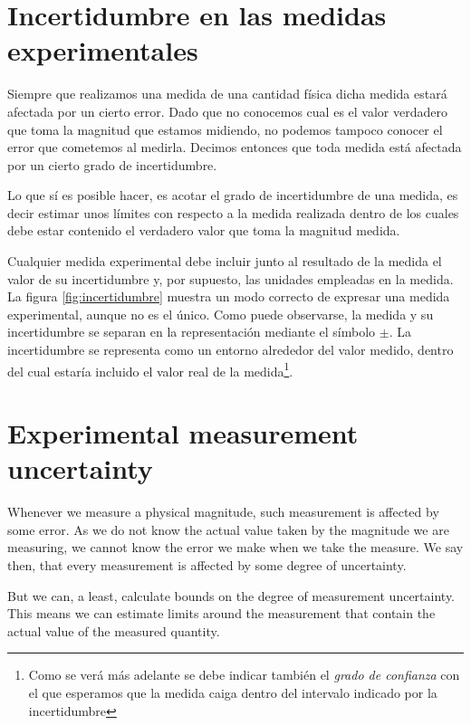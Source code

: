 \begin{paracol}{2}
\section{Incertidumbre en las medidas experimentales}
Siempre que realizamos una medida de una cantidad física dicha medida  estará afectada por un cierto error. Dado que no conocemos cual es el valor verdadero que toma la magnitud que estamos midiendo, no podemos tampoco conocer el error que cometemos al medirla. Decimos entonces que toda medida está afectada por un cierto grado de incertidumbre.

Lo que sí es posible hacer, es acotar el grado de incertidumbre de una medida, es decir estimar unos límites con respecto a la medida realizada dentro de los cuales debe estar contenido el verdadero valor que toma la magnitud medida.

Cualquier medida experimental debe incluir junto al resultado de la medida el valor de su incertidumbre y, por supuesto, las unidades empleadas en la medida. La figura \ref{fig:incertidumbre} muestra un modo correcto de expresar una medida experimental, aunque no es el único. Como puede observarse, la medida y su incertidumbre se separan en la representación mediante el símbolo $\pm$.  La incertidumbre se representa como  un entorno alrededor del valor medido, dentro del cual estaría incluido el valor real de la medida\footnote{Como se verá más adelante se debe indicar también el \emph{grado de confianza} con el que esperamos que la medida caiga dentro del intervalo indicado por la incertidumbre}.
\switchcolumn
\section{Experimental measurement uncertainty}
Whenever we measure a physical magnitude, such measurement is affected by some error. As we do not know the actual value taken by the magnitude we are measuring, we cannot know the error we make when we take the measure. We say then, that every measurement is affected by some degree of uncertainty.

But we can, a least, calculate bounds on the degree of measurement uncertainty. This means we can estimate limits around the measurement that contain the actual value of the measured quantity.


\end{paracol}
